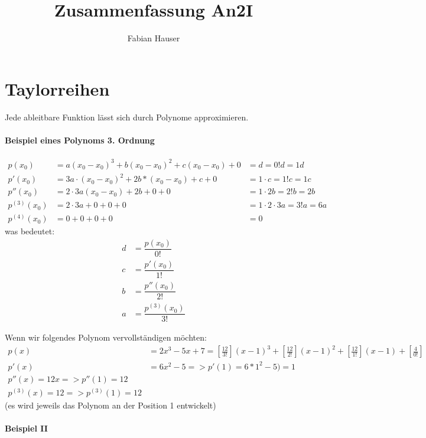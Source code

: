 %


\title{Zusammenfassung An2I}
\author{Fabian Hauser}
 

\maketitle

\section{Taylorreihen}
Jede ableitbare Funktion lässt sich durch Polynome approximieren.


\paragraph{Beispiel eines Polynoms 3. Ordnung}
\begin{align*}
	p(x_0) & = a(x_0-x_0)^3 + b(x_0-x_0)^2 + c(x_0-x_0) + 0 &= d = 0!d = 1d \\
	p'(x_0) &= 3a \cdot (x_0-x_0)^2 + 2b * (x_0-x_0) + c + 0 &= 1 \cdot c = 1!c = 1c \\
	p''(x_0) &= 2 \cdot 3a (x_0-x_0) + 2b + 0 + 0 &= 1 \cdot 2b = 2!b = 2b \\
	p^{(3)}(x_0) &= 2 \cdot 3a + 0 + 0 + 0 &= 1 \cdot 2 \cdot 3a = 3!a = 6a \\
	p^{(4)}(x_0) &= 0 + 0 + 0 + 0 &= 0
\end{align*}
was bedeutet:
\begin{align*}
	d &= \dfrac{p(x_0)}{0!} \\
	c &= \dfrac{p'(x_0)}{1!} \\
	b &= \dfrac{p''(x_0)}{2!} \\
	a &= \dfrac{p^{(3)}(x_0)}{3!}
\end{align*}

Wenn wir folgendes Polynom vervollständigen möchten:
\begin{align*}
	p(x) &= 2x^3 - 5x + 7 = [\frac{12}{3!}](x-1)^3 + [\frac{12}{2!}](x-1)^2 + [\frac{12}{1!}](x-1) + [\frac{4}{0!}] \\
	p'(x) &= 6x^2 - 5 => p'(1) = 6 * 1^2 -5 ) =1 \\
	p''(x) = 12x => p''(1) = 12 \\
	p^{(3)}(x) = 12 => p^{(3)}(1) = 12
\end{align*}
(es wird jeweils das Polynom an der Position 1 entwickelt)

\paragraph{Beispiel II}

